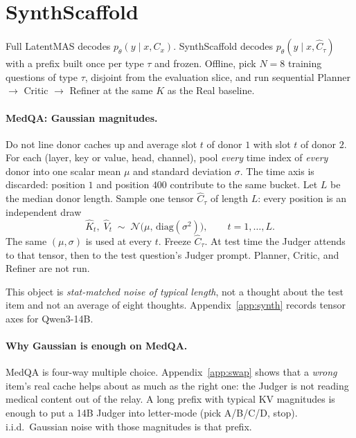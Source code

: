 \documentclass[11pt]{article}
\begin{document}
\section{SynthScaffold}
\label{sec:method}

Full LatentMAS decodes $p_\theta(y\mid x, C_x)$.
SynthScaffold decodes $p_\theta(y\mid x, \widehat C_\tau)$ with a prefix
built once per type $\tau$ and frozen.
Offline, pick $N{=}8$ training questions of type $\tau$, disjoint from
the evaluation slice, and run sequential Planner $\to$ Critic $\to$
Refiner at the same $K$ as the Real baseline.

\paragraph{MedQA: Gaussian magnitudes.}
Do not line donor caches up and average slot $t$ of donor $1$ with slot
$t$ of donor $2$.
For each (layer, key or value, head, channel), pool \emph{every} time
index of \emph{every} donor into one scalar mean $\mu$ and standard
deviation $\sigma$.
The time axis is discarded: position $1$ and position $400$ contribute to
the same bucket.
Let $L$ be the median donor length.
Sample one tensor $\widehat C_\tau$ of length $L$: every position is an
independent draw
\begin{equation}
  \widehat{K}_{t},\;\widehat{V}_{t}
  \;\sim\;
  \mathcal{N}\bigl(\mu,\,\mathrm{diag}(\sigma^{2})\bigr),
  \qquad t=1,\ldots,L.
\end{equation}
The same $(\mu,\sigma)$ is used at every $t$.
Freeze $\widehat C_\tau$.
At test time the Judger attends to that tensor, then to the test
question's Judger prompt.
Planner, Critic, and Refiner are not run.

This object is \emph{stat-matched noise of typical length}, not a
thought about the test item and not an average of eight thoughts.
Appendix~\ref{app:synth} records tensor axes for Qwen3-14B.

\paragraph{Why Gaussian is enough on MedQA.}
MedQA is four-way multiple choice.
Appendix~\ref{app:swap} shows that a \emph{wrong} item's real cache
helps about as much as the right one: the Judger is not reading medical
content out of the relay.
A long prefix with typical KV magnitudes is enough to put a 14B Judger
into letter-mode (pick A/B/C/D, stop).
i.i.d.\ Gaussian noise with those magnitudes is that prefix.
\end{document}
